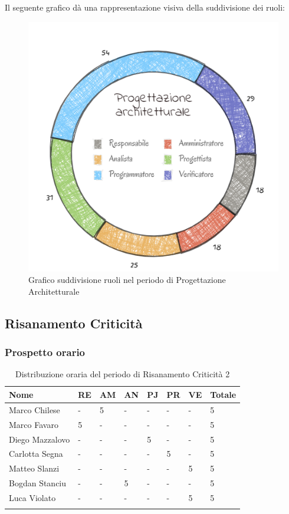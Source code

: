 Il seguente grafico dà una rappresentazione visiva della suddivisione dei ruoli:
\begin{figure}[H]
	\centering
  		\includegraphics[width=0.8\linewidth]{./images/torta_pa.png}
  		\caption{Grafico suddivisione ruoli nel periodo di Progettazione Architetturale}
  		\label{fig:grafico suddivione ruoli pa}
\end{figure}


\subsection{Risanamento Criticità}
\subsubsection{Prospetto orario}

\begin{longtable}{|C{.30\textwidth}|C{.06\textwidth}|C{.06\textwidth}|C{.06\textwidth} | C{.06\textwidth}| C{.06\textwidth} | C{.06\textwidth} | C{.10\textwidth} |}
\hline
\textbf{Nome} & \textbf{RE} & \textbf{AM} & \textbf{AN} & \textbf{PJ} & \textbf{PR} & \textbf{VE} & \textbf{Totale}\\
\hline 
Marco Chilese & - & 5 & - & - & - & - & 5 \\
\hline
Marco Favaro & 5 & - & - & - & - & - & 5 \\
\hline
Diego Mazzalovo & - & - & - & 5 & - & - & 5 \\
\hline
Carlotta Segna & - & - & - & - & 5 & - & 5 \\
\hline
Matteo Slanzi & - & - & - & - & - & 5 & 5 \\
\hline
Bogdan Stanciu & - & - & 5 & - & - & - & 5 \\
\hline
Luca Violato & - & - & - & - & - & 5 & 5 \\   
\hline


\caption{Distribuzione oraria del periodo di Risanamento Criticità 2}
\label{Distribuzione oraria rc2}
\end{longtable}

